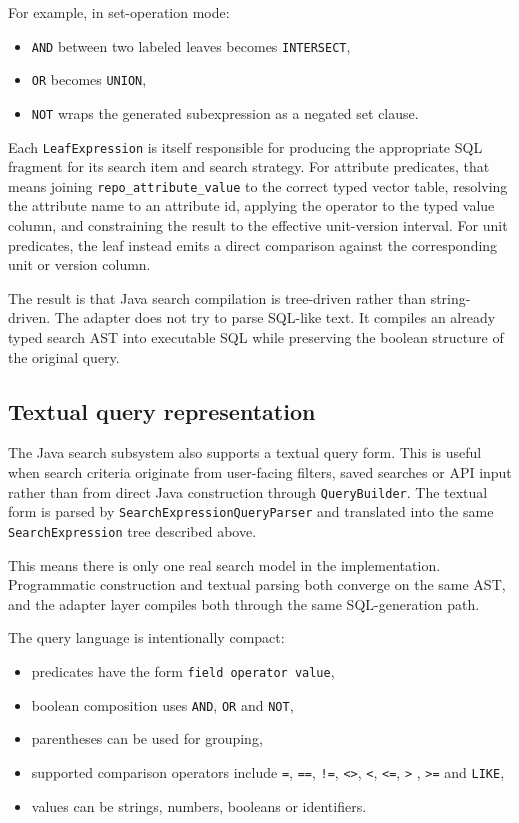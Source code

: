 For example, in set-operation mode:
\begin{itemize}
\item \texttt{AND} between two labeled leaves becomes \texttt{INTERSECT},
\item \texttt{OR} becomes \texttt{UNION},
\item \texttt{NOT} wraps the generated subexpression as a negated set clause.
\end{itemize}

Each \texttt{LeafExpression} is itself responsible for producing the appropriate SQL fragment for its search item and search strategy. For attribute predicates, that means joining \texttt{repo\_attribute\_value} to the correct typed vector table, resolving the attribute name to an attribute id, applying the operator to the typed value column, and constraining the result to the effective unit-version interval. For unit predicates, the leaf instead emits a direct comparison against the corresponding unit or version column.

The result is that Java search compilation is tree-driven rather than string-driven. The adapter does not try to parse SQL-like text. It compiles an already typed search AST into executable SQL while preserving the boolean structure of the original query.

\subsection{Textual query representation}

The Java search subsystem also supports a textual query form. This is useful when search criteria originate from user-facing filters, saved searches or API input rather than from direct Java construction through \texttt{QueryBuilder}. The textual form is parsed by \texttt{SearchExpressionQueryParser} and translated into the same \texttt{SearchExpression} tree described above.

This means there is only one real search model in the implementation. Programmatic construction and textual parsing both converge on the same AST, and the adapter layer compiles both through the same SQL-generation path.

The query language is intentionally compact:
\begin{itemize}
\item predicates have the form \texttt{field operator value},
\item boolean composition uses \texttt{AND}, \texttt{OR} and \texttt{NOT},
\item parentheses can be used for grouping,
\item supported comparison operators include \texttt{=}, \texttt{==}, \texttt{!=}, \texttt{<>}, \texttt{<}, \texttt{<=}, \texttt{>} , \texttt{>=} and \texttt{LIKE},
\item values can be strings, numbers, booleans or identifiers.
\end{itemize}

